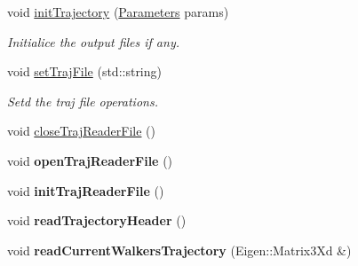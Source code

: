 \begin{DoxyCompactItemize}
void \hyperlink{class_trajectory_aaeda8b05ad61298fbd2aba2a3192486e}{init\+Trajectory} (\hyperlink{class_parameters}{Parameters} params)
\begin{DoxyCompactList}\small\item\em Initialice the output files if any. \end{DoxyCompactList}\item 
\mbox{\label{class_trajectory_a00a28c1782a0a661b40ad9dfefc0d3f4}} 
void \hyperlink{class_trajectory_a00a28c1782a0a661b40ad9dfefc0d3f4}{set\+Traj\+File} (std\+::string)
\begin{DoxyCompactList}\small\item\em Setd the traj file operations. \end{DoxyCompactList}\end{DoxyCompactItemize}
\textbf{ }\par
\begin{DoxyCompactItemize}
\item 
void \hyperlink{class_trajectory_a9aedf2530dca72ca629741585717c64a}{close\+Traj\+Reader\+File} ()
\item 
\mbox{\label{class_trajectory_a9239f7d5d05f02ce58b6ad2e7be231d7}} 
void {\bfseries open\+Traj\+Reader\+File} ()
\item 
\mbox{\label{class_trajectory_a727883a1c29c9bdb8d4cdb01888023da}} 
void {\bfseries init\+Traj\+Reader\+File} ()
\item 
\mbox{\label{class_trajectory_ad436905c5614d4ac3a52acb6d2211b61}} 
void {\bfseries read\+Trajectory\+Header} ()
\item 
\mbox{\label{class_trajectory_a5f96383db2d95b41a46dc752b00f70e6}} 
void {\bfseries read\+Current\+Walkers\+Trajectory} (Eigen\+::\+Matrix3\+Xd \&)
\end{DoxyCompactItemize}

